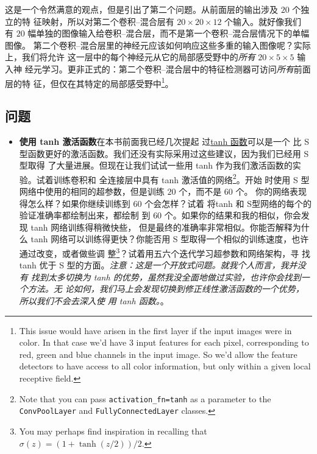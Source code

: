 这是一个令然满意的观点，但是引出了第二个问题。从前面层的输出涉及 $20$ 个独立的特
征映射，所以对第二个卷积--混合层有 $20 \times 20 \times 12$ 个输入。就好像我们
有 $20$ 幅单独的图像输入给卷积--混合层，而不是第一个卷积--混合层情况下的单幅图像。
第二个卷积--混合层里的神经元应该如何响应这些多重的输入图像呢？实际上，我们将允许
这一层中的每个神经元从它的局部感受野中的\emph{所有} $20 \times 5 \times 5$ 输入神
经元学习。更非正式的：第二个卷积--混合层中的特征检测器可访问\emph{所有}前面层的特
征，但仅在其特定的局部感受野中\footnote{This issue would have arisen in the
  first layer if the input images were in color. In that case we'd have 3 input
  features for each pixel, corresponding to red, green and blue channels in the
  input image. So we'd allow the feature detectors to have access to all color
  information, but only within a given local receptive field.}。

\subsection*{问题}

\begin{itemize}
\item \textbf{使用 tanh 激活函数}\quad 在本书前面我已经几次提起
  过\hyperref[subsec:other_models_of_artificial_neuron]{tanh 函数}可以是一个
  比 S型函数更好的激活函数。我们还没有实际采用过这些建议，因为我们已经用 S 型取得
  了大量进展。但现在让我们试试一些用 tanh 作为我们激活函数的实验。试着训练卷积和
  全连接层中具有 tanh 激活值的网络\footnote{Note that you can pass
    \lstinline!activation_fn=tanh! as a parameter to the
    \lstinline!ConvPoolLayer! and \lstinline!FullyConnectedLayer! classes.}。开始
  时使用 S 型网络中使用的相同的超参数，但是训练 $20$ 个\epochs{}，而不是 $60$ 个。
  你的网络表现得怎么样？如果你继续训练到 $60$ 个\epochs{}会怎样？试着
  将tanh 和 S型网络的每个\epoch{}的验证准确率都绘制出来，都绘制
  到 $60$ 个\epochs{}。如果你的结果和我的相似，你会发现 tanh 网络训练得稍微快些，
  但是最终的准确率非常相似。你能否解释为什么 tanh 网络可以训练得更快？你能否用 S
  型取得一个相似的训练速度，也许通过改变\learningrate{}，或者做些调
  整\footnote{You may perhaps find inspiration in recalling that
    $\sigma(z) = (1+\tanh(z/2))/2$.}？试着用五六个迭代学习超参数和网络架构，寻
  找 tanh 优于 S 型的方面。\emph{注意：这是一个开放式问题。就我个人而言，我并没有
    找到太多切换为 tanh 的优势，虽然我没全面地做过实验，也许你会找到一个方法。无
    论如何，我们马上会发现切换到修正线性激活函数的一个优势，所以我们不会去深入使
    用 tanh 函数。}。
\end{itemize}

